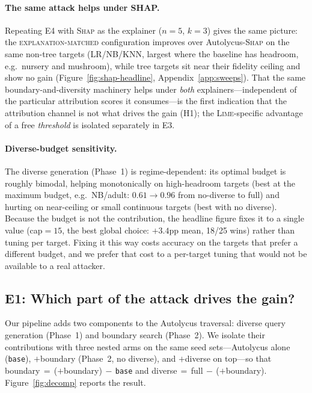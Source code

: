 \documentclass[sigconf,anonymous,review]{acmart}
\begin{document}
\paragraph{The same attack helps under SHAP.}
Repeating E4 with \textsc{Shap} as the explainer ($n{=}5$, $k{=}3$) gives the same picture: the
\textsc{explanation-matched} configuration improves over Autolycus-\textsc{Shap} on the same non-tree targets (LR/NB/KNN,
largest where the baseline has headroom, e.g.\ nursery and mushroom), while tree targets sit near
their fidelity ceiling and show no gain (Figure~\ref{fig:shap-headline}, Appendix~\ref{app:sweeps}).
That the same boundary-and-diversity machinery helps under \emph{both} explainers---independent of the
particular attribution scores it consumes---is the first indication that the attribution channel is
not what drives the gain (H1); the \textsc{Lime}-specific advantage of a free \emph{threshold} is
isolated separately in E3.

\paragraph{Diverse-budget sensitivity.}
The diverse generation (Phase~1) is regime-dependent: its optimal budget is roughly bimodal,
helping monotonically on high-headroom targets (best at the maximum budget, e.g.\ NB/adult:
$0.61{\to}0.96$ from no-diverse to full) and hurting on near-ceiling or small continuous targets
(best with no diverse). Because the budget is not the contribution, the headline figure fixes it
to a single value (cap${=}15$, the best global choice: $+3.4$pp mean, 18/25 wins) rather than
tuning per target. Fixing it this way costs accuracy on the targets that prefer a different budget,
and we prefer that cost to a per-target tuning that would not be available to a real attacker.

\subsection{E1: Which part of the attack drives the gain?}
\label{subsec:e1}
Our pipeline adds two components to the Autolycus traversal: diverse query generation (Phase~1) and
boundary search (Phase~2). We isolate their contributions with three nested arms on the same seed
sets---Autolycus alone (\texttt{base}), $+$boundary (Phase~2, no diverse), and $+$diverse on top---so
that boundary$\,=\,$($+$boundary)$\,-\,$\texttt{base} and
diverse$\,=\,$full$\,-\,$($+$boundary). Figure~\ref{fig:decomp} reports the result.
\end{document}
